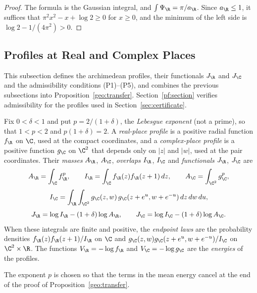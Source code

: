 \begin{proof}
The formula is the Gaussian integral, and $\int\Psi_\R=\pi/a_\R$. Since
$a_\R\le1$, it suffices that $\pi^2x^2-x+\log2\ge0$ for $x\ge0$, and the
minimum of the left side is $\log2-1/(4\pi^2)>0$.
\end{proof}

\subsection{Profiles at Real and Complex Places}

This subsection defines the archimedean profiles, their functionals $J_\R$ and
$J_\C$ and the admissibility conditions (P1)--(P5), and combines the previous
subsections into Proposition~\ref{geo:transfer}. Section~\ref{pf:section}
verifies admissibility for the profiles used in
Section~\ref{sec:certificate}.

\begin{definition}\label{geo:profiles}
Fix $0<\delta<1$ and put $p=2/(1+\delta)$, the \emph{Lebesgue exponent}
(not a prime), so that $1<p<2$ and $p(1+\delta)=2$. A \emph{real-place
profile} is a positive radial function $f_\R$ on $\C$, used at the compact
coordinates, and a \emph{complex-place profile} is a positive function
$g_\C$ on $\C^2$ that depends only on $|z|$ and $|w|$, used at the pair
coordinates. Their \emph{masses} $A_\R$, $A_\C$, \emph{overlaps} $I_\R$,
$I_\C$ and \emph{functionals} $J_\R$, $J_\C$ are
\[
 A_\R=\int_\C f_\R^p,\qquad I_\R=\int_\C f_\R(z)f_\R(z+1)\,dz,
 \qquad A_\C=\int_{\C^2}g_\C^p,
\]
\[
 I_\C=\int_\R\int_{\C^2}g_\C(z,w)\,g_\C(z+e^u,w+e^{-u})\,dz\,dw\,du,
\]
\[
 J_\R=\log I_\R-(1+\delta)\log A_\R,\qquad
 J_\C=\log I_\C-(1+\delta)\log A_\C.
\]
When these integrals are finite and positive, the \emph{endpoint laws}
are the probability densities $f_\R(z)f_\R(z+1)/I_\R$ on $\C$ and
$g_\C(z,w)g_\C(z+e^u,w+e^{-u})/I_\C$ on $\C^2\times\R$. The functions
$V_\R=-\log f_\R$ and $V_\C=-\log g_\C$ are the \emph{energies} of the
profiles.
\end{definition}

The exponent $p$ is chosen so that the terms in the mean energy cancel at
the end of the proof of Proposition~\ref{geo:transfer}.

